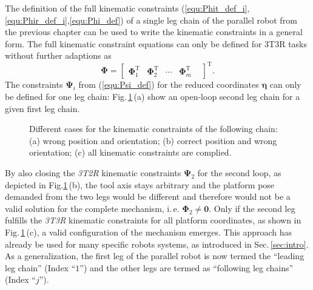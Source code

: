 \documentclass[robotics,article,submit,moreauthors,pdftex]{Definitions/mdpi}
\newcommand{\bm}[1]{\boldsymbol{#1}}
\newcommand{\transp}[0]{{\mathrm{T}}}
\begin{document}
The definition of the full kinematic constraints (\ref{equ:Phit_def_i},\ref{equ:Phir_def_i},\ref{equ:Phi_def}) of a single leg chain of the parallel robot from the previous chapter can be used to write the kinematic constraints
in a general form.
%
The full kinematic constraint equations can only be defined for 3T3R tasks without further adaptions as
%
\begin{equation}
\bm{\Phi}
=
\begin{bmatrix}
\bm{\Phi}_1^\transp &
\bm{\Phi}_2^\transp &
\cdots &
\bm{\Phi}_m^\transp &
\end{bmatrix}^\transp.
\label{equ:constr_Phi_PKM}
\end{equation}
%
The constraints $\bm{\Psi}_i$ from (\ref{equ:Psi_def}) for the reduced coordinates $\bm{\eta}$ can only be defined for one leg chain:
Fig.\,\ref{fig:pkm_constr_rot_follow}\,(a) show an open-loop second leg chain for a given first leg chain.
%
\begin{figure}[tb]
    
    \caption{Different cases for the kinematic constraints of the following chain: (a) wrong position and orientation; (b) correct position and wrong orientation; (c) all kinematic constraints are complied.}
    \label{fig:pkm_constr_rot_follow}
\end{figure} 
%
By also closing the \emph{3T2R} kinematic constraints $\bm{\Psi}_2$ for the second loop, as depicted in Fig.\ref{fig:pkm_constr_rot_follow}\,(b), the tool axis stays arbitrary and the platform pose demanded from the two legs would be different and therefore would not be a valid solution for the complete mechanism, i.\,e. $\bm{\Phi}_2 \ne \bm{0}$.
Only if the second leg fulfills the \emph{3T3R} kinematic constraints for all platform coordinates, as shown in Fig.\,\ref{fig:pkm_constr_rot_follow}\,(c), a valid configuration of the mechanism emerges.
This approach has already be used for many specific robots systems, as introduced in Sec.\,\ref{sec:intro}.
As a generalization, the first leg of the parallel robot is now termed the ``leading leg chain'' (Index ``$1$'') and the other legs are termed as ``following leg chains'' (Index ``$j$'').
\end{document}
